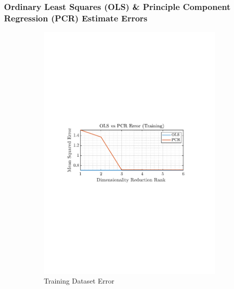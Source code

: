 \documentclass[12pt]{article}
\begin{document}
 	\subsubsection{Ordinary Least Squares (OLS) \& Principle Component Regression (PCR)  Estimate Errors}
 	\begin{figure}[H]
 		\centering
 		\begin{subfigure}{0.49\textwidth}
 			\centering
 			\includegraphics[trim={2.2cm 11.2cm 3.15cm  11.2cm}, clip, width=\textwidth]{../MATLAB/figures/q1_6c_fig01.pdf} 
 			\captionsetup{justification=centering}
 			\caption{Training Dataset Error}
 		\end{subfigure}
 		\begin{subfigure}{0.49\textwidth}
 			\centering

\end{subfigure}
\end{figure}
\end{document}
